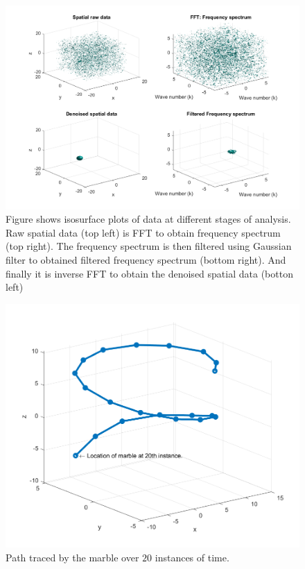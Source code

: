 \documentclass{article}
\begin{document}
\begin{figure}[!t]
  \centering
    \includegraphics[width=\linewidth]{./Figs/isosurface.png}
    \caption{Figure shows isosurface plots of data at different stages of analysis. Raw spatial data (top left) is FFT to obtain frequency spectrum (top right). The frequency spectrum is then filtered using Gaussian filter to obtained filtered frequency spectrum (bottom right). And finally it is inverse FFT to obtain the denoised spatial data (botton left)}
  \label{fig:iso}
\end{figure}

\begin{figure}[!h]
  \centering
    \includegraphics[scale=0.343]{./Figs/path.png}
    \caption{Path traced by the marble over $20$ instances of time.}
  \label{fig:path}
\end{figure}
\end{document}
